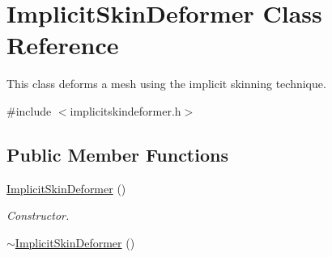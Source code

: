\hypertarget{classImplicitSkinDeformer}{}\section{Implicit\+Skin\+Deformer Class Reference}
\label{classImplicitSkinDeformer}


This class deforms a mesh using the implicit skinning technique.  




{\ttfamily \#include $<$implicitskindeformer.\+h$>$}

\subsection*{Public Member Functions}
\begin{DoxyCompactItemize}
\item 
\hyperlink{classImplicitSkinDeformer_af9d0d9156addcf96d6102bc96d0773b5}{Implicit\+Skin\+Deformer} ()\hypertarget{classImplicitSkinDeformer_af9d0d9156addcf96d6102bc96d0773b5}{}\label{classImplicitSkinDeformer_af9d0d9156addcf96d6102bc96d0773b5}

\begin{DoxyCompactList}\small\item\em Constructor. \end{DoxyCompactList}\item 
\hyperlink{classImplicitSkinDeformer_a2ff4a36f4ea1c50a6694c9f24b59fb39}{$\sim$\+Implicit\+Skin\+Deformer} ()\hypertarget{classImplicitSkinDeformer_a2ff4a36f4ea1c50a6694c9f24b59fb39}{}\label{classImplicitSkinDeformer_a2ff4a36f4ea1c50a6694c9f24b59fb39}


\end{DoxyCompactItemize}
